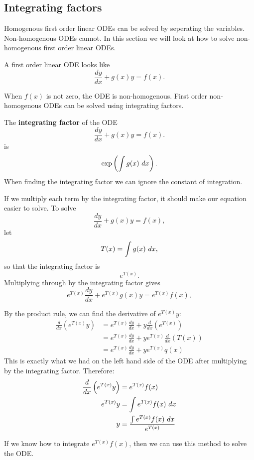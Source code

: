 \subsection{Integrating factors}
Homogenous first order linear ODEs can be solved by seperating the variables. Non-homogenous ODEs cannot. In this section we will look at how to 
solve non-homogenous first order linear ODEs.

A first order linear ODE looks like
\begin{equation*}
\frac{dy}{dx}+g(x)y=f(x).
\end{equation*}

When \(f(x)\) is not zero, the ODE is non-homogenous.
First order non-homogenous ODEs can be solved using integrating factors.

\begin{definition}
The \textbf{integrating factor} of the ODE 
\[\frac{dy}{dx}+g(x)y=f(x).\]
is 
\[\exp\left({\int g(x)\ dx}\right).\]
When finding the integrating factor we can ignore the constant of integration.
\end{definition}

If we multiply each term by the integrating factor, it should make our equation easier to solve.
To solve 
\[\frac{dy}{dx}+g(x)y=f(x),\]
let \[T(x)=\int g(x)\ dx,\]
so that the integrating factor is \[e^{T(x)}.\]
Multiplying through by the integrating factor gives
\[e^{T(x)}\frac{dy}{dx}+e^{T(x)}g(x)y=e^{T(x)}f(x),\]

By the product rule, we can find the derivative of $e^{T(x)}y$:
\begin{align*}
\frac{d}{dx}\left(e^{T(x)}y\right) &=e^{T(x)}\frac{dy}{dx}+y\frac{d}{dx}\left(e^{T(x)}\right) \\
&=e^{T(x)}\frac{dy}{dx}+ye^{T(x)}\frac{d}{dx}\left(T(x)\right) \\
&=e^{T(x)}\frac{dy}{dx}+ye^{T(x)}q(x)
\end{align*}
This is exactly what we had on the left hand side of the ODE after multiplying by the integrating factor. Therefore:
\begin{align*}
\frac{d}{dx}\left(e^{T(x)}y\right) &= e^{T(x)}f(x)\\
e^{T(x)}y &= \int e^{T(x)}f(x)\ dx\\
y &= \frac{\int e^{T(x)}f(x)\ dx}{e^{T(x)}}\\
\end{align*}

If we know how to integrate \(e^{T(x)}f(x)\), then we can use this method to solve the ODE.

